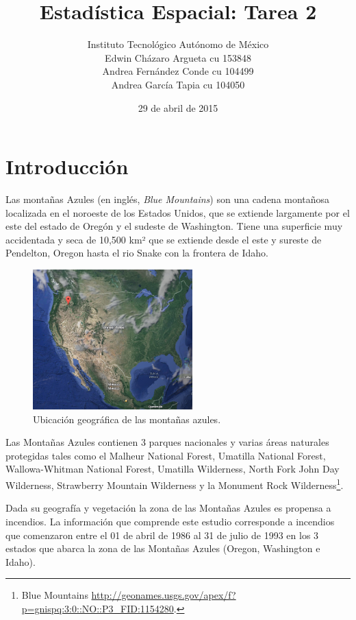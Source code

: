 \documentclass[12,]{article}
\title{Estadística Espacial: Tarea 2}
\author{Instituto Tecnológico Autónomo de México \\ Edwin Cházaro Argueta cu 153848 \\ Andrea Fernández Conde cu 104499 \\ Andrea García Tapia cu 104050}
\date{29 de abril de 2015}
\let\rmarkdownfootnote\footnote%
\def\footnote{\protect\rmarkdownfootnote}
\begin{document}
\maketitle


{
\hypersetup{linkcolor=black}
\setcounter{tocdepth}{2}
\tableofcontents
}
\pagebreak

\section{Introducción}\label{introduccion}

Las montañas Azules (en inglés, \emph{Blue Mountains}) son una cadena
montañosa localizada en el noroeste de los Estados Unidos, que se
extiende largamente por el este del estado de Oregón y el sudeste de
Washington. Tiene una superficie muy accidentada y seca de 10,500 km²
que se extiende desde el este y sureste de Pendelton, Oregon hasta el
rio Snake con la frontera de Idaho.

\begin{figure}[H]
\centering
\includegraphics[width=0.55\textwidth]{imagenes/usa.png}
\caption{Ubicación geográfica de las montañas azules.}

\end{figure}

Las Montañas Azules contienen 3 parques nacionales y varias áreas
naturales protegidas tales como el Malheur National Forest, Umatilla
National Forest, Wallowa-Whitman National Forest, Umatilla Wilderness,
North Fork John Day Wilderness, Strawberry Mountain Wilderness y la
Monument Rock Wilderness\footnote{Blue Mountains
  \url{http://geonames.usgs.gov/apex/f?p=gnispq:3:0::NO::P3_FID:1154280}.}.

Dada su geografía y vegetación la zona de las Montañas Azules es
propensa a incendios. La información que comprende este estudio
corresponde a incendios que comenzaron entre el 01 de abril de 1986 al
31 de julio de 1993 en los 3 estados que abarca la zona de las Montañas
Azules (Oregon, Washington e Idaho).
\end{document}
